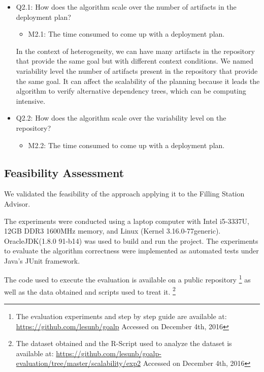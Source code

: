 \begin{itemize}
  \item Q2.1: How does the algorithm scale over the number of artifacts in the deployment plan?
  \begin{itemize}
    \item M2.1: The time consumed to come up with a deployment plan.
  \end{itemize}

  In the context of heterogeneity, we can have many artifacts in the repository that provide the same goal but with different context conditions.
  We named variability level the number of artifacts present in the repository that provide the same goal. It can affect the scalability of the planning because it leads the algorithm to verify alternative dependency trees, which can be computing intensive.

  \item Q2.2: How does the algorithm scale over the variability level on the repository?
  \begin{itemize}
    \item M2.2: The time consumed to come up with a deployment plan.
  \end{itemize}
\end{itemize}

\subsection{Feasibility Assessment}

We validated the feasibility of the approach applying it to the Filling Station Advisor.

The experiments were conducted using a laptop computer with Intel i5-3337U, 12GB DDR3 1600MHz memory, and Linux (Kernel 3.16.0-77generic). OracleJDK(1.8.0 91-b14) was used to build and run the project.
The experiments to evaluate the algorithm correctness
were implemented as automated tests under Java’s JUnit framework.

The code used to execute the evaluation is available on a public repository
\footnote{The evaluation experiments and step by step guide are available at:
\url{https://github.com/lesunb/goalp} Accessed on December 4th, 2016}
as well as the data obtained and scripts used to treat it.
\footnote{The dataset obtained and the R-Script\cite{the_r_foundation_r_2016} used to analyze the dataset is available at:
\url{https://github.com/lesunb/goalp-evaluation/tree/master/scalability/exp2} Accessed on December 4th, 2016}

